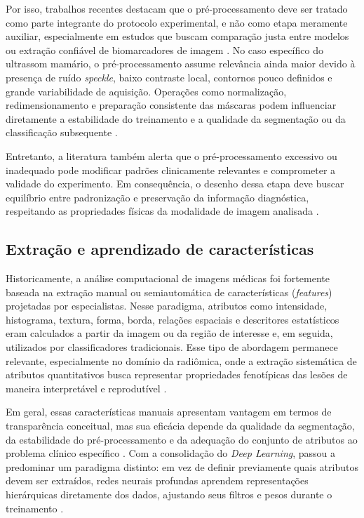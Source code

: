 \documentclass[tcc,capa]{texufpel}
\begin{document}
Por isso, trabalhos recentes destacam que o pré-processamento deve ser tratado como parte integrante do protocolo experimental, e não como etapa meramente auxiliar, especialmente em estudos que buscam comparação justa entre modelos ou extração confiável de biomarcadores de imagem \cite{Ce2024,Cobo2023}. No caso específico do ultrassom mamário, o pré-processamento assume relevância ainda maior devido à presença de ruído \textit{speckle}, baixo contraste local, contornos pouco definidos e grande variabilidade de aquisição. Operações como normalização, redimensionamento e preparação consistente das máscaras podem influenciar diretamente a estabilidade do treinamento e a qualidade da segmentação ou da classificação subsequente \cite{Guo2018}.

Entretanto, a literatura também alerta que o pré-processamento excessivo ou inadequado pode modificar padrões clinicamente relevantes e comprometer a validade do experimento. Em consequência, o desenho dessa etapa deve buscar equilíbrio entre padronização e preservação da informação diagnóstica, respeitando as propriedades físicas da modalidade de imagem analisada \cite{Cobo2023,vanTimmeren2020}.

\subsection{Extração e aprendizado de características}

Historicamente, a análise computacional de imagens médicas foi fortemente baseada na extração manual ou semiautomática de características (\textit{features}) projetadas por especialistas. Nesse paradigma, atributos como intensidade, histograma, textura, forma, borda, relações espaciais e descritores estatísticos eram calculados a partir da imagem ou da região de interesse e, em seguida, utilizados por classificadores tradicionais. Esse tipo de abordagem permanece relevante, especialmente no domínio da radiômica, onde a extração sistemática de atributos quantitativos busca representar propriedades fenotípicas das lesões de maneira interpretável e reprodutível \cite{vanTimmeren2020,Ce2024}.

Em geral, essas características manuais apresentam vantagem em termos de transparência conceitual, mas sua eficácia depende da qualidade da segmentação, da estabilidade do pré-processamento e da adequação do conjunto de atributos ao problema clínico específico \cite{vanTimmeren2020,Cobo2023}. Com a consolidação do \textit{Deep Learning}, passou a predominar um paradigma distinto: em vez de definir previamente quais atributos devem ser extraídos, redes neurais profundas aprendem representações hierárquicas diretamente dos dados, ajustando seus filtros e pesos durante o treinamento \cite{Lee2017}.
\end{document}
